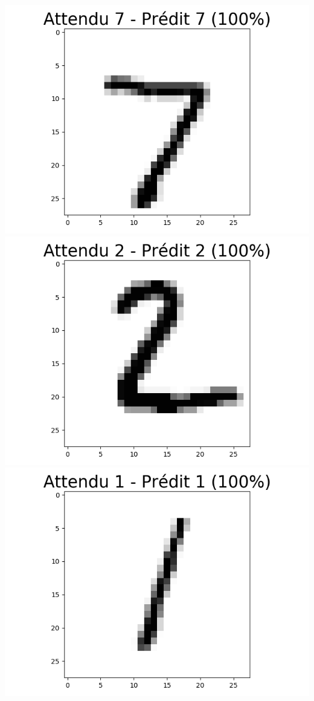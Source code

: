 \documentclass[11pt,class=report,crop=false]{standalone}
\begin{document}
\begin{center}
\includegraphics[scale=\myscale,scale=0.20]{figures/tfconv-chiffre-test-result-0}
\includegraphics[scale=\myscale,scale=0.20]{figures/tfconv-chiffre-test-result-1}
\includegraphics[scale=\myscale,scale=0.20]{figures/tfconv-chiffre-test-result-2}

\end{center}
\end{document}
